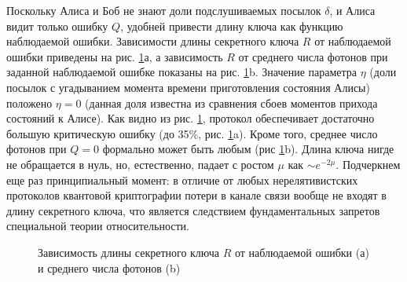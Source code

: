 Поскольку Алиса и Боб не знают доли подслушиваемых посылок $\delta$, и Алиса видит только ошибку $Q$, удобней привести длину ключа как функцию наблюдаемой ошибки. Зависимости длины секретного ключа $R$ от наблюдаемой ошибки приведены на рис. \ref{fig:key_rate}а, а зависимость $R$ от среднего числа фотонов при заданной наблюдаемой ошибке показаны на рис. \ref{fig:key_rate}b.
Значение параметра $\eta$ (доли посылок с угадыванием момента времени приготовления состояния Алисы) положено $\eta = 0$ (данная доля известна из сравнения сбоев моментов прихода состояний к Алисе). Как видно из рис. \ref{fig:key_rate}, протокол обеспечивает достаточно большую критическую ошибку (до 35\%, рис. \ref{fig:key_rate}a). Кроме того, среднее число фотонов при $Q=0$ формально может быть любым (рис \ref{fig:key_rate}b). Длина ключа нигде не обращается в нуль, но, естественно, падает с ростом $\mu$ как $\sim e^{-2\mu}$. Подчеркнем еще раз принципиальный момент: в отличие от любых нерелятивистских протоколов квантовой криптографии потери в канале связи вообще не входят в длину секретного ключа, что является следствием фундаментальных запретов специальной теории относительности.

\begin{figure}[h]
  \caption{Зависимость длины секретного ключа $R$ от наблюдаемой ошибки (а) и среднего числа фотонов (b)}
  \label{fig:key_rate}
  \end{figure}

\clearpage